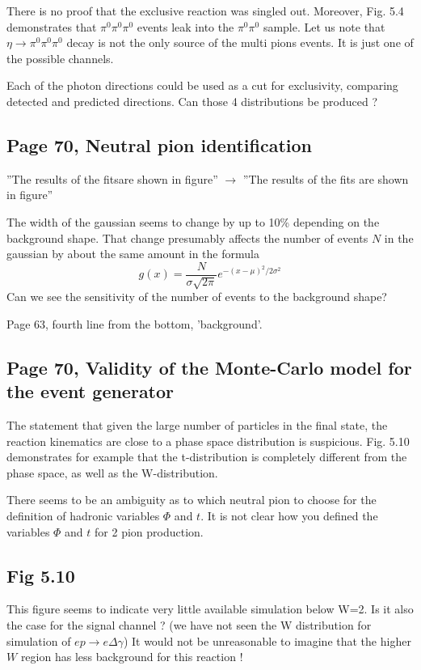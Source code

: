 \documentclass[11pt]{paper}
\begin{document}
There is no proof that the exclusive reaction was singled out. Moreover, Fig. 5.4 demonstrates that 
$\pi^0\pi^0\pi^0$ events leak into the $\pi^0\pi^0$ sample. Let us note that $\eta\to \pi^0\pi^0\pi^0$  decay is not the only source of the multi pions events. It is just one of the possible channels.

Each of the photon directions could be used as a cut for exclusivity, comparing detected and predicted directions.
Can those 4 distributions be produced ?

\subsection*{Page 70, Neutral pion identification}

''The results of the fitsare shown in figure'' $\rightarrow$ ''The results of the fits are shown in figure''

The width of the gaussian seems to change by up to 10\% depending on the background shape.
That change presumably affects the number of events $N$ in the gaussian by about the same amount in the formula
$$g(x)=\frac{N}{\sigma\sqrt{2\pi}}e^{-(x-\mu)^2/2\sigma^2}$$
Can we see the sensitivity of the number of events to the background shape?

Page 63, fourth line from the bottom, 'background'.

\subsection*{Page 70, Validity of the Monte-Carlo model for the event generator}

The statement that given the large number of particles in the final state, the reaction kinematics are close to a phase space distribution is suspicious. 
Fig. 5.10 demonstrates for example that the t-distribution is completely different from the phase space, as well as the W-distribution. 

There seems to be an ambiguity as to which neutral pion to choose for the definition of hadronic variables $\Phi$ and $t$.
It is not clear how you defined the variables $\Phi$ and $t$ for 2 pion production.

\subsection*{Fig 5.10}
This figure seems to indicate very little available simulation below W=2. 
Is it also the case for the signal channel ? (we have not seen the W distribution for simulation of $ep\rightarrow e\Delta\gamma$)
It would not be unreasonable to imagine that the higher $W$ region has less background for this reaction !
\end{document}
